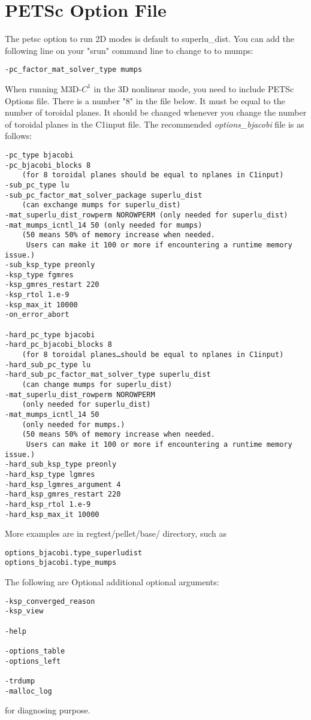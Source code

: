 \chapter{PETSc Option File}

\noindent
The petsc option to run 2D modes is default to superlu\_dist. You can add the following line on your "srun" command line
to change to to mumps:

\begin{verbatim}
-pc_factor_mat_solver_type mumps
\end{verbatim}

\noindent
When running M3D-$C^1$ in the 3D nonlinear mode, you need to include PETSc Options file.
There is a number "8" in the file below. It must be equal to the number of toroidal planes. It
should be changed whenever you change the number of toroidal planes in the C1input file. The recommended
{\it options\_bjacobi} file is as follows:

\begin{verbatim}
-pc_type bjacobi
-pc_bjacobi_blocks 8
    (for 8 toroidal planes should be equal to nplanes in C1input)
-sub_pc_type lu
-sub_pc_factor_mat_solver_package superlu_dist
    (can exchange mumps for superlu_dist)
-mat_superlu_dist_rowperm NOROWPERM (only needed for superlu_dist)
-mat_mumps_icntl_14 50 (only needed for mumps)
    (50 means 50% of memory increase when needed.
     Users can make it 100 or more if encountering a runtime memory issue.)
-sub_ksp_type preonly
-ksp_type fgmres
-ksp_gmres_restart 220
-ksp_rtol 1.e-9
-ksp_max_it 10000
-on_error_abort

-hard_pc_type bjacobi
-hard_pc_bjacobi_blocks 8
    (for 8 toroidal planes…should be equal to nplanes in C1input)
-hard_sub_pc_type lu
-hard_sub_pc_factor_mat_solver_type superlu_dist
    (can change mumps for superlu_dist)
-mat_superlu_dist_rowperm NOROWPERM
    (only needed for superlu_dist)
-mat_mumps_icntl_14 50
    (only needed for mumps.)
    (50 means 50% of memory increase when needed.
     Users can make it 100 or more if encountering a runtime memory issue.)
-hard_sub_ksp_type preonly
-hard_ksp_type lgmres
-hard_ksp_lgmres_argument 4
-hard_ksp_gmres_restart 220
-hard_ksp_rtol 1.e-9
-hard_ksp_max_it 10000
\end{verbatim}

\noindent
More examples are in regtest/pellet/base/ directory, such as 

\begin{verbatim}
options_bjacobi.type_superludist
options_bjacobi.type_mumps 
\end{verbatim}

\noindent
The following are Optional additional optional arguments:

\begin{verbatim}
-ksp_converged_reason
-ksp_view

-help

-options_table
-options_left

-trdump
-malloc_log
\end{verbatim}

for diagnosing purpose.

